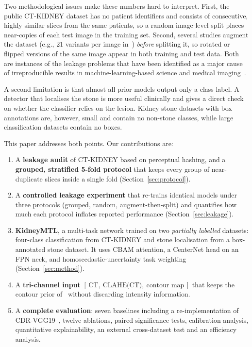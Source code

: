 \documentclass[11pt]{article}
\begin{document}
Two methodological issues make these numbers hard to interpret. First, the public CT-KIDNEY dataset
\citep{islam2022vision} has no patient identifiers and consists of consecutive, highly similar slices from the
same patients, so a random image-level split places near-copies of each test image in the training set.
Second, several studies augment the dataset (e.g., 21 variants per image in~\citep{devi2025cdr}) \emph{before}
splitting it, so rotated or flipped versions of the same image appear in both training and test data. Both are
instances of the leakage problems that have been identified as a major cause of irreproducible results in
machine-learning-based science and medical imaging~\citep{kapoor2023leakage,roberts2021pitfalls,varoquaux2022failures}.

A second limitation is that almost all prior models output only a class label. A detector that localises the
stone is more useful clinically and gives a direct check on whether the classifier relies on the lesion.
Kidney stone datasets with box annotations are, however, small and contain no non-stone classes, while large
classification datasets contain no boxes.

This paper addresses both points. Our contributions are:
\begin{enumerate}
  \item A \textbf{leakage audit} of CT-KIDNEY based on perceptual hashing, and a \textbf{grouped, stratified
  5-fold protocol} that keeps every group of near-duplicate slices inside a single fold (Section~\ref{sec:protocol}).
  \item A \textbf{controlled leakage experiment} that re-trains identical models under three protocols
  (grouped, random, augment-then-split) and quantifies how much each protocol inflates reported performance
  (Section~\ref{sec:leakage}).
  \item \textbf{KidneyMTL}, a multi-task network trained on two \emph{partially labelled} datasets: four-class
  classification from CT-KIDNEY and stone localisation from a box-annotated stone dataset. It uses CBAM
  attention, a CenterNet head on an FPN neck, and homoscedastic-uncertainty task weighting (Section~\ref{sec:method}).
  \item A \textbf{tri-channel input} $[\,\text{CT},\ \text{CLAHE(CT)},\ \text{contour map}\,]$ that keeps the
  contour prior of~\citep{devi2025cdr} without discarding intensity information.
  \item A \textbf{complete evaluation}: seven baselines including a re-implementation of
  CDR-VGG19~\citep{devi2025cdr}, twelve ablations, paired significance tests, calibration analysis,
  quantitative explainability, an external cross-dataset test and an efficiency analysis.
\end{enumerate}
\end{document}

